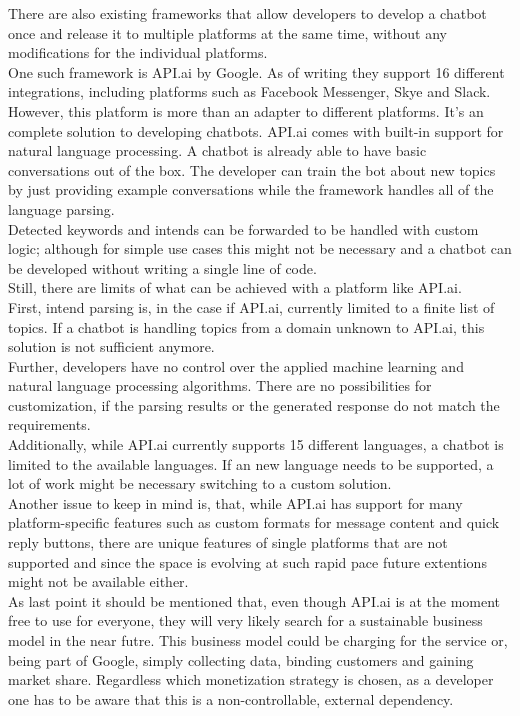 There are also existing frameworks that allow developers to develop a chatbot once and release it to multiple platforms at the same time, without any modifications for the individual platforms.
\\
One such framework is API.ai by Google. As of writing they support 16 different integrations, including platforms such as Facebook Messenger, Skye and Slack\cite{apiai}. However, this platform is more than an adapter to different platforms. It's an complete solution to developing chatbots. API.ai comes with built-in support for natural language processing. A chatbot is already able to have basic conversations out of the box. The developer can train the bot about new topics by just providing example conversations while the framework handles all of the language parsing.
\\
Detected keywords and intends can be forwarded to be handled with custom logic; although for simple use cases this might not be necessary and a chatbot can be developed without writing a single line of code.
\\

Still, there are limits of what can be achieved with a platform like API.ai.
\\
First, intend parsing is, in the case if API.ai, currently limited to a finite list of topics. If a chatbot is handling topics from a domain unknown to API.ai, this solution is not sufficient anymore.
\\
Further, developers have no control over the applied machine learning and natural language processing algorithms.
There are no possibilities for customization, if the parsing results or the generated response do not match the requirements.
\\
Additionally, while API.ai currently supports 15 different languages, a chatbot is limited to the available languages.
If an new language needs to be supported, a lot of work might be necessary switching to a custom solution.
\\
Another issue to keep in mind is, that, while API.ai has support for many platform-specific features such as custom formats for message content and quick reply buttons, there are unique features of single platforms that are not supported and since the space is evolving at such rapid pace future extentions might not be available either.
\\
As last point it should be mentioned that, even though API.ai is at the moment free to use for everyone, they will very likely search for a sustainable business model in the near futre. This business model could be charging for the service or, being part of Google, simply collecting data, binding customers and gaining market share. Regardless which monetization strategy is chosen, as a developer one has to be aware that this is a non-controllable, external dependency.
